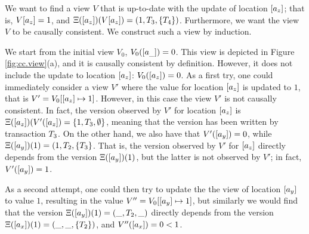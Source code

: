 \begin{example}
%
%
% 
We want to find a view $V$ that is up-to-date with the update of location $[a_z]$; 
that is, $V[a_z] = 1$, and $\Xi([a_z])(V[a_z]) = (1, T_3, \{T_4\})$.
Furthermore, we want the view $V$ to be causally consistent. 
We construct such a view by induction. 

We start from the initial view $V_0$, $V_0([a_{\_}]) = 0$. This view is 
depicted in Figure \ref{fig:cc.view}(a), and it is 
causally consistent by definition. However, it does not include the update to location $[a_z]$: 
$V_0([a_z]) = 0$. As a first try, one could immediately consider a view $V'$ 
where the value for location $[a_z]$ is updated to $1$, 
that is $V' = V_0[ [a_z] \mapsto 1]$. However, in this case 
the view $V'$ is not causally consistent. In fact, the version observed 
by $V'$ for location $[a_z]$ is $\Xi([a_z])(V'([a_z]) = 
\{1, T_3, \emptyset\}$, meaning that the version has been written 
by transaction $T_3$. On the other hand, we also have 
that $V'([a_y]) = 0$, while $\Xi([a_{y}])(1) = (1, T_2, 
\{T_3\}$. That is, the version observed by $V'$ for $[a_z]$ 
directly depends from the version $\Xi([a_y])(1)$, but the latter 
is not observed by $V'$; in fact, $V'([a_y]) = 1$. 

As a second attempt, one could then try to update the the view of location 
$[a_y]$ to value $1$, resulting in the value $V'' = V_0[ [a_y] \mapsto 1]$, 
but similarly we would find that the version 
$\Xi([a_y])(1) = (\_, T_2, \_)$ directly depends from the version 
$\Xi([a_x])(1) = (\_, \_, \{T_2\})$, and $V''([a_x]) = 0 < 1$. 


\end{example}

